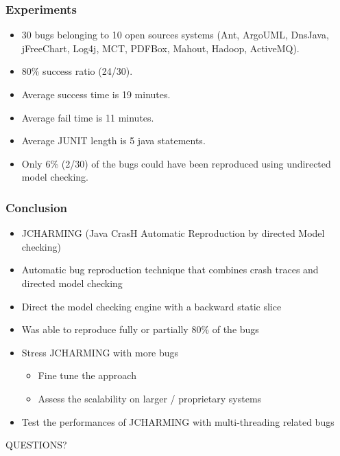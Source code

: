 \documentclass{beamer}
\begin{document}
\begin{frame}
\frametitle{Experiments}

\begin{itemize}
  \item 30 bugs belonging to 10 open sources systems (Ant, ArgoUML, DnsJava, jFreeChart, Log4j, MCT, PDFBox, Mahout, Hadoop, ActiveMQ).
  \item 80\% success ratio (24/30).
  \item Average success time is 19 minutes.
  \item Average fail time is 11 minutes.
  \item Average JUNIT length is 5 java statements.
  \item Only 6\% (2/30) of the bugs could have been reproduced using undirected model checking.
\end{itemize}

\end{frame}

\begin{frame}
\frametitle{Conclusion}

\begin{itemize}
\item JCHARMING (Java CrasH Automatic
Reproduction by directed Model checking)
\item Automatic bug
reproduction technique that combines crash traces and
directed model checking
\item Direct the model checking engine with a backward static slice
\item Was able to reproduce fully or partially 80\%  of the bugs
\vspace{0.5cm}
\item Stress JCHARMING with more bugs
\begin{itemize}
\item Fine tune the approach
\item Assess the scalability on larger / proprietary systems
\end{itemize}
\item Test the performances of JCHARMING with multi-threading related bugs

\end{itemize}

\end{frame}



\begin{frame}
\Huge{\centerline{QUESTIONS?}}
\end{frame}

\end{document}
